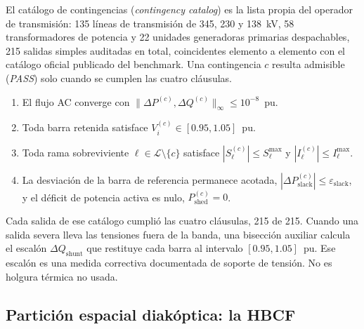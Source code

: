 El catálogo de contingencias (\emph{contingency catalog}) es la lista propia del operador de transmisión: 135 líneas de transmisión de 345, 230 y 138~kV, 58 transformadores de potencia y 22 unidades generadoras primarias despachables, 215 salidas simples auditadas en total, coincidentes elemento a elemento con el catálogo oficial publicado del benchmark. Una contingencia $c$ resulta admisible (\emph{PASS}) solo cuando se cumplen las cuatro cláusulas.
\begin{enumerate}
\item El flujo AC converge con $\|\Delta P^{(c)}, \Delta Q^{(c)}\|_{\infty} \le 10^{-8}$~pu.
\item Toda barra retenida satisface $V_i^{(c)} \in [0.95, 1.05]$~pu.
\item Toda rama sobreviviente $\ell \in \mathcal{L}\setminus\{c\}$ satisface $|S_\ell^{(c)}| \le S_\ell^{\max}$ y $|I_\ell^{(c)}| \le I_\ell^{\max}$.
\item La desviación de la barra de referencia permanece acotada, $|\Delta P_{\mathrm{slack}}^{(c)}| \le \varepsilon_{\mathrm{slack}}$, y el déficit de potencia activa es nulo, $P_{\mathrm{shed}}^{(c)}=0$.
\end{enumerate}
Cada salida de ese catálogo cumplió las cuatro cláusulas, 215 de 215. Cuando una salida severa lleva las tensiones fuera de la banda, una bisección auxiliar calcula el escalón $\Delta Q_{\mathrm{shunt}}$ que restituye cada barra al intervalo $[0.95, 1.05]$~pu. Ese escalón es una medida correctiva documentada de soporte de tensión. No es holgura térmica no usada.

\subsection{Partición espacial diakóptica: la HBCF}
\label{sub:hbcf}

